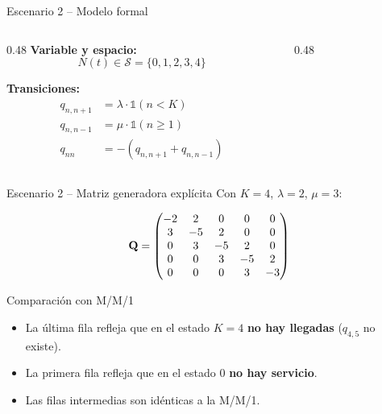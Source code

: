 \documentclass[aspectratio=1610, 9pt]{beamer}
\begin{document}
\begin{frame}{Escenario 2 -- Modelo formal}
\begin{columns}[T]
\begin{column}{0.48\textwidth}
\textbf{Variable y espacio:}
\[
N(t) \in \mathcal{S} = \{0,1,2,3,4\}
\]

\vspace{4pt}
\textbf{Transiciones:}
\begin{align*}
q_{n,n+1} &= \lambda \cdot \mathbb{1}(n < K) \\
q_{n,n-1} &= \mu \cdot \mathbb{1}(n \ge 1) \\
q_{nn} &= -(q_{n,n+1} + q_{n,n-1})
\end{align*}
\end{column}
\begin{column}{0.48\textwidth}
\centering
{}
\end{column}
\end{columns}
\end{frame}

\begin{frame}{Escenario 2 -- Matriz generadora expl\'icita}
Con $K=4$, $\lambda=2$, $\mu=3$:

\[
\mathbf{Q} = \begin{pmatrix}
-2 &  2 &  0 &  0 &  0 \\
 3 & -5 &  2 &  0 &  0 \\
 0 &  3 & -5 &  2 &  0 \\
 0 &  0 &  3 & -5 &  2 \\
 0 &  0 &  0 &  3 & -3
\end{pmatrix}
\]

\vspace{6pt}
\begin{alertblock}{Comparaci\'on con M/M/1}
\begin{itemize}
    \item La \'ultima fila refleja que en el estado $K=4$ \textbf{no hay llegadas} ($q_{4,5}$ no existe).
    \item La primera fila refleja que en el estado 0 \textbf{no hay servicio}.
    \item Las filas intermedias son id\'enticas a la M/M/1.
\end{itemize}
\end{alertblock}
\end{frame}
\end{document}
